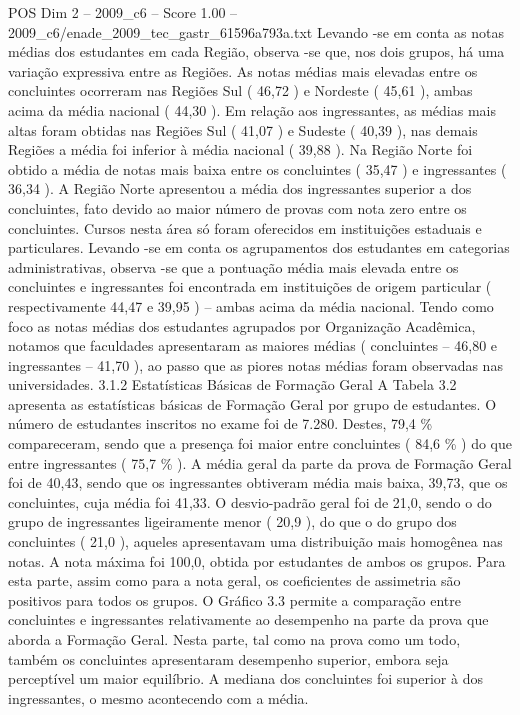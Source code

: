 \begin{textsample}{POS Dim 2 – 2009\_c6 – Score 1.00 – 2009\_c6/enade\_2009\_tec\_gastr\_61596a793a.txt}
Levando -se em conta as notas médias dos estudantes em cada Região, observa -se que, nos dois grupos, há uma variação expressiva entre as Regiões.
As notas médias mais elevadas entre os concluintes ocorreram nas Regiões Sul ( 46,72 ) e Nordeste ( 45,61 ), ambas acima da média nacional ( 44,30 ).
Em relação aos ingressantes, as médias mais altas foram obtidas nas Regiões Sul ( 41,07 ) e Sudeste ( 40,39 ), nas demais Regiões a média foi inferior à média nacional ( 39,88 ).
Na Região Norte foi obtido a média de notas mais baixa entre os concluintes ( 35,47 ) e ingressantes ( 36,34 ).
A Região Norte apresentou a média dos ingressantes superior a dos concluintes, fato devido ao maior número de provas com nota zero entre os concluintes.
Cursos nesta área só foram oferecidos em instituições estaduais e particulares.
Levando -se em conta os agrupamentos dos estudantes em categorias administrativas, observa -se que a pontuação média mais elevada entre os concluintes e ingressantes foi encontrada em instituições de origem particular ( respectivamente 44,47 e 39,95 ) – ambas acima da média nacional.
Tendo como foco as notas médias dos estudantes agrupados por Organização Acadêmica, notamos que faculdades apresentaram as maiores médias ( concluintes – 46,80 e ingressantes – 41,70 ), ao passo que as piores notas médias foram observadas nas universidades. 3.1.2 Estatísticas Básicas de Formação Geral A Tabela 3.2 apresenta as estatísticas básicas de Formação Geral por grupo de estudantes.
O número de estudantes inscritos no exame foi de 7.280.
Destes, 79,4 \% compareceram, sendo que a presença foi maior entre concluintes ( 84,6 \% ) do que entre ingressantes ( 75,7 \% ).
A média geral da parte da prova de Formação Geral foi de 40,43, sendo que os ingressantes obtiveram média mais baixa, 39,73, que os concluintes, cuja média foi 41,33.
O desvio-padrão geral foi de 21,0, sendo o do grupo de ingressantes ligeiramente menor ( 20,9 ), do que o do grupo dos concluintes ( 21,0 ), aqueles apresentavam uma distribuição mais homogênea nas notas.
A nota máxima foi 100,0, obtida por estudantes de ambos os grupos.
Para esta parte, assim como para a nota geral, os coeficientes de assimetria são positivos para todos os grupos.
O Gráfico 3.3 permite a comparação entre concluintes e ingressantes relativamente ao desempenho na parte da prova que aborda a Formação Geral.
Nesta parte, tal como na prova como um todo, também os concluintes apresentaram desempenho superior, embora seja perceptível um maior equilíbrio.
A mediana dos concluintes foi superior à dos ingressantes, o mesmo acontecendo com a média.

\end{textsample}
